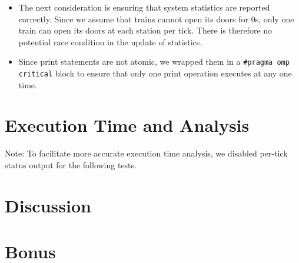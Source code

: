\documentclass[a4paper,12pt]{article}
\begin{document}
\begin{itemize}
\begin{enumerate}
		\end{enumerate}
		\item The next consideration is ensuring that system statistics are reported correctly. Since we assume that trains cannot open its doors for 0s, only one train can open its doors at each station per tick. There is therefore no potential race condition in the update of statistics.
		\item Since print statements are not atomic, we wrapped them in a \texttt{#pragma omp critical} block to ensure that only one print operation executes at any one time.
	\end{itemize}
	
	\section{Execution Time and Analysis}
	
	Note: To facilitate more accurate execution time analysis, we disabled per-tick status output for the following tests.
	
	\section{Discussion}
	
	\section{Bonus}
\end{document}
